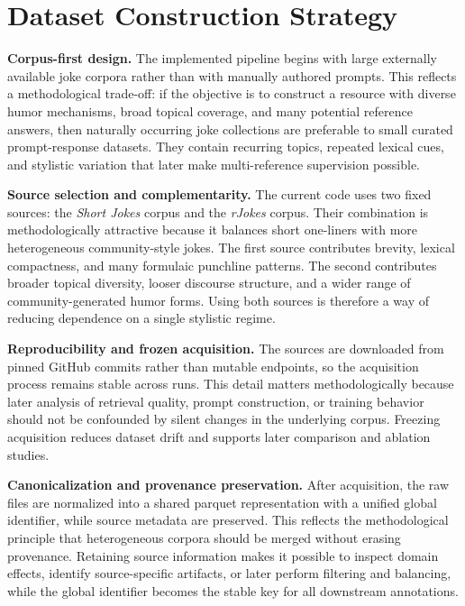 \documentclass[12pt]{extarticle}
\begin{document}
\section{Dataset Construction Strategy}

\textbf{Corpus-first design.} The implemented pipeline begins with large externally available joke corpora rather than with manually authored prompts. This reflects a methodological trade-off: if the objective is to construct a resource with diverse humor mechanisms, broad topical coverage, and many potential reference answers, then naturally occurring joke collections are preferable to small curated prompt-response datasets. They contain recurring topics, repeated lexical cues, and stylistic variation that later make multi-reference supervision possible.

\textbf{Source selection and complementarity.} The current code uses two fixed sources: the \emph{Short Jokes} corpus and the \emph{rJokes} corpus. Their combination is methodologically attractive because it balances short one-liners with more heterogeneous community-style jokes. The first source contributes brevity, lexical compactness, and many formulaic punchline patterns. The second contributes broader topical diversity, looser discourse structure, and a wider range of community-generated humor forms. Using both sources is therefore a way of reducing dependence on a single stylistic regime.

\textbf{Reproducibility and frozen acquisition.} The sources are downloaded from pinned GitHub commits rather than mutable endpoints, so the acquisition process remains stable across runs. This detail matters methodologically because later analysis of retrieval quality, prompt construction, or training behavior should not be confounded by silent changes in the underlying corpus. Freezing acquisition reduces dataset drift and supports later comparison and ablation studies.

\textbf{Canonicalization and provenance preservation.} After acquisition, the raw files are normalized into a shared parquet representation with a unified global identifier, while source metadata are preserved. This reflects the methodological principle that heterogeneous corpora should be merged without erasing provenance. Retaining source information makes it possible to inspect domain effects, identify source-specific artifacts, or later perform filtering and balancing, while the global identifier becomes the stable key for all downstream annotations.
\end{document}
